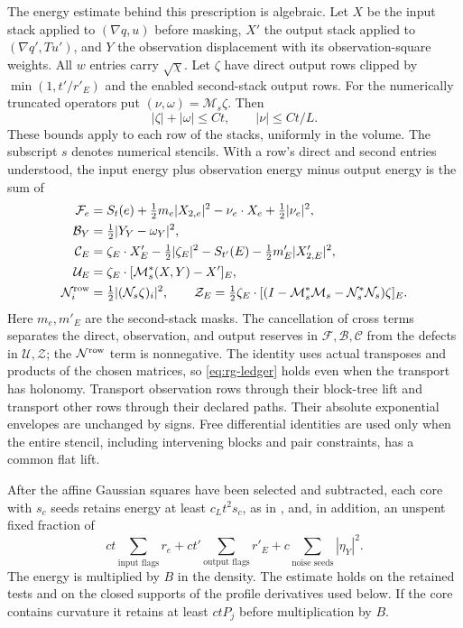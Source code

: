 The energy estimate behind this prescription is algebraic.  Let $X$ be
the input stack applied to $(\nabla q,u)$ before masking, $X'$ the output
stack applied to $(\nabla q',Tu')$, and $Y$ the observation displacement
with its observation-square weights.  All $w$ entries carry
$\sqrt\chi$.  Let $\zeta$ have direct output rows clipped by
$\min(1,t'/r'_E)$ and the enabled second-stack output rows.  For the
numerically truncated operators put $(\nu,\omega)=\mathcal M_s\zeta$.
Then
\[
                |\zeta|+|\omega|\le Ct,
                      \qquad |\nu|\le Ct/L.
\]
These bounds apply to each row of the stacks, uniformly in the volume.
The subscript $s$ denotes numerical stencils.  With a row's direct and
second entries understood, the input energy plus observation energy
minus output energy is the sum of
\begin{align}
 \mathcal F_e&=S_t(e)+\tfrac12m_e|X_{2,e}|^2
                         -\nu_e\cdot X_e+\tfrac12|\nu_e|^2,
 \nonumber\\
 \mathcal B_Y&=\tfrac12|Y_Y-\omega_Y|^2,
 \nonumber\\
 \mathcal C_E&=\zeta_E\cdot X'_E-\tfrac12|\zeta_E|^2
                         -S_{t'}(E)-\tfrac12m'_E|X'_{2,E}|^2,
 \nonumber\\
 \mathcal U_E&=\zeta_E\cdot[\mathcal M_s^*(X,Y)-X']_E,
 \nonumber\\
 \mathcal N_i^{\rm row}&=\tfrac12| (\mathcal N_s\zeta)_i|^2,
 \qquad
 \mathcal Z_E=\tfrac12\zeta_E\cdot
       [(I-\mathcal M_s^*\mathcal M_s-\mathcal N_s^*\mathcal N_s)
                                                    \zeta]_E.
 \label{eq:rg-ledger}
\end{align}
Here $m_e,m'_E$ are the second-stack masks.  The cancellation of cross
terms separates the direct, observation, and output reserves in
$\mathcal F,\mathcal B,\mathcal C$ from the defects in
$\mathcal U,\mathcal Z$; the $\mathcal N^{\rm row}$ term is nonnegative.
The identity uses actual transposes and products of the chosen matrices, so
\eqref{eq:rg-ledger} holds even when the transport has holonomy.
Transport observation rows through their block-tree lift and transport
other rows through their declared paths.  Their absolute exponential
envelopes are unchanged by signs.  Free differential identities are
used only when the entire stencil, including intervening blocks and
pair constraints, has a common flat lift.

\begin{lemma}
\label{lem:rg-reserve}
After the affine Gaussian squares have been selected and subtracted,
each core with $s_c$ seeds retains energy at least $c_Lt^2s_c$,
as in \cite[Lemma ``Core reserve'']{SharpO4}, and, in addition, an unspent
fixed fraction of
\begin{equation}
 ct\sum_{\text{input flags}}r_e
       +ct'\sum_{\text{output flags}}r'_E
       +c\sum_{\text{noise seeds}}|\eta_Y|^2.
 \label{eq:R9}
\end{equation}
The energy is multiplied by $B$ in the density.  The estimate holds on
the retained tests and on the closed supports of the profile derivatives
used below.  If the core contains curvature it retains at least
$c tP_j$ before multiplication by $B$.
\end{lemma}

